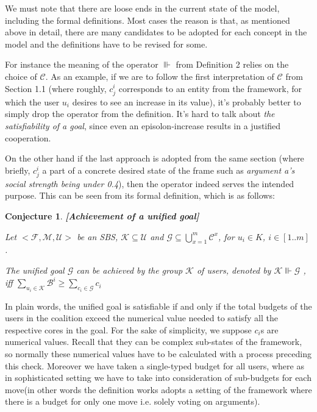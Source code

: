\documentclass{article}
\newtheorem{conjecture}{Conjecture}
\begin{document}
We must note that there are loose ends in the current state of the model, including the formal definitions. Most cases the reason is that, as mentioned above in detail, there are many candidates to be adopted for each concept in the model and the definitions have to be revised for some.

For instance the meaning of the operator $\Vvdash$ from Definition 2 relies on the choice of $\mathcal{C}$. As an example, if we are to follow the first interpretation of $\mathcal{C}$ from Section 1.1 (where roughly, $c_j^i$ corresponds to an entity from the framework, for which the user $u_i$ desires to see an increase in its value), it's probably better to simply drop the operator from the definition. It's hard to talk about \emph{the satisfiability of a goal}, since even an episolon-increase results in a justified cooperation. 

On the other hand if the last approach is adopted from the same section (where briefly, $c_j^i$ a part of a concrete desired state of the frame such as \emph{argument a's social strength being under 0.4}), then the operator indeed serves the intended purpose. This can be seen from its formal definition, which is as follows:

\begin{conjecture}\textbf{[Achievement of a unified goal]}

Let  $<\mathcal{F}, \mathcal{M}, \mathcal{U}>$ be an SBS,  $\mathcal{K} \subseteq \mathcal{U}$ and $\mathcal{G} \subseteq \bigcup_{x=1}^{m} \mathcal{C}^{x} $,  for $u_i \in K$, $i \in [1..m]$.

The unified goal $\mathcal{G}$ can be achieved by the group $\mathcal{K}$ of users, denoted by $ \mathcal{K} \Vvdash \mathcal{G}$ , iff $\sum_{u_{i} \in \mathcal{K}} \mathcal{B}^i \geq \sum_{c_{i} \in \mathcal{G}} c_i $ 


\end{conjecture}


In plain words, the unified goal is satisfiable if and only if the total budgets of the users in the coalition exceed the numerical value needed to satisfy all the respective cores in the goal. For the sake of simplicity, we suppose $c_i$s are numerical values. Recall that they can be complex sub-states of the framework, so normally these numerical values have to be calculated with a process preceding this check. Moreover we have taken a single-typed budget for all users, where as in sophisticated setting we have to take into consideration of sub-budgets for each move(in other words the definition works adopts a setting of the framework where there is a budget for only one move i.e. solely voting on arguments). 
\end{document}
